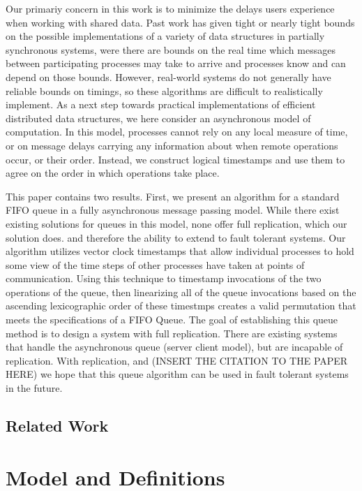 \documentclass[a4paper,USenglish]{lipics-v2021} %
\begin{document}
Our primariy concern in this work is to minimize the delays users experience when working with shared data.  Past work has given tight or nearly tight bounds on the possible implementations of a variety of data structures \cite{Kosa99,WangTalmageLeeWelch18} in partially synchronous systems, were there are bounds on the real time which messages between participating processes may take to arrive and processes know and can depend on those bounds.  However, real-world systems do not generally have reliable bounds on timings, so these algorithms are difficult to realistically implement.  As a next step towards practical implementations of efficient distributed data structures, we here consider an asynchronous model of computation.  In this model, processes cannot rely on any local measure of time, or on message delays carrying any information about when remote operations occur, or their order.  Instead, we construct logical timestamps and use them to agree on the order in which operations take place.

This paper contains two results.  First, we present an algorithm for a standard FIFO queue in a fully asynchronous message passing model. While there exist existing solutions for queues in this model, none offer full replication, which our solution does.  and therefore the ability to extend to fault tolerant systems. Our algorithm utilizes vector clock timestamps that allow individual processes to hold some view of the time steps of other processes have taken at points of communication. Using this technique to timestamp invocations of the two operations of the queue, then linearizing all of the queue invocations based on the ascending lexicographic order of these timestmps creates a valid permutation that meets the specifications of a FIFO Queue.  The goal of establishing this queue method is to design a system with full replication. There are existing systems that handle the asynchronous queue (server client model), but are incapable of replication. With replication, and (INSERT THE CITATION TO THE PAPER HERE) we hope that this queue algorithm can be used in fault tolerant systems in the future.

\subsection{Related Work}

\section{Model and Definitions}
\end{document}
